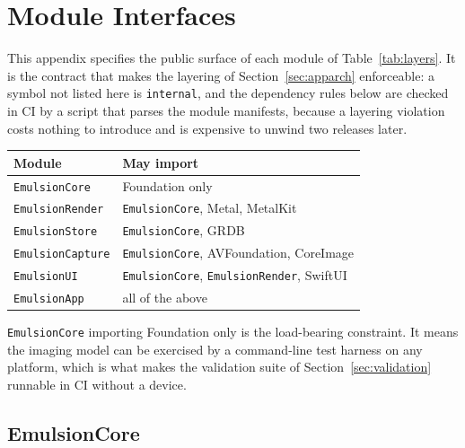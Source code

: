 \section{Module Interfaces}
\label{app:api}

This appendix specifies the public surface of each module of
Table~\ref{tab:layers}. It is the contract that makes the layering of
Section~\ref{sec:apparch} enforceable: a symbol not listed here is
\texttt{internal}, and the dependency rules below are checked in CI by a script
that parses the module manifests, because a layering violation costs nothing to
introduce and is expensive to unwind two releases later.

\begin{center}
\renewcommand{\arraystretch}{1.1}
\footnotesize
\begin{tabular}{@{}ll@{}}
\toprule
\textbf{Module} & \textbf{May import} \\
\midrule
\texttt{EmulsionCore}    & Foundation only \\
\texttt{EmulsionRender}  & \texttt{EmulsionCore}, Metal, MetalKit \\
\texttt{EmulsionStore}   & \texttt{EmulsionCore}, GRDB \\
\texttt{EmulsionCapture} & \texttt{EmulsionCore}, AVFoundation, CoreImage \\
\texttt{EmulsionUI}      & \texttt{EmulsionCore}, \texttt{EmulsionRender}, SwiftUI \\
\texttt{EmulsionApp}     & all of the above \\
\bottomrule
\end{tabular}
\end{center}

\noindent \texttt{EmulsionCore} importing Foundation only is the load-bearing
constraint. It means the imaging model can be exercised by a command-line test
harness on any platform, which is what makes the validation suite of
Section~\ref{sec:validation} runnable in CI without a device.

\subsection{EmulsionCore}

